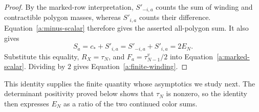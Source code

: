 \begin{proof}
By the marked-row interpretation, $S'_{-i,a}$ counts the sum of winding
and contractible polygon masses, whereas $S'_{i,a}$ counts their
difference. Equation~\eqref{a:minus-scalar} therefore gives the asserted
all-polygon sum. It also gives
\[
 S_a=c_*+S'_{i,a}=S'_{-i,a}+S'_{i,a}=2E_N.
\]
Substitute this equality, $R_X=\tau_N$, and
$F_a=\tau^v_{N-1}/2$ into Equation~\eqref{a:marked-scalar}. Dividing by $2$
gives Equation~\eqref{a:finite-winding}.
\end{proof}

This identity supplies the finite quantity whose asymptotics we study
next. The determinant positivity proved below shows that $\tau_N$ is
nonzero, so the identity then expresses $E_N$ as a ratio of the two
continued color sums.

